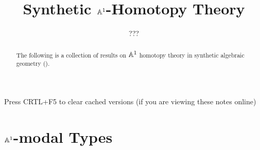 \documentclass{../util/zariski}
\title{Synthetic $\mathbb{A}^1$-Homotopy Theory}
\author{???}
\begin{document}
\maketitle

\begin{center}
  \color{purple}
  \large{Press CRTL+F5 to clear cached versions}
  \large{(if you are viewing these notes online)}
\end{center}

\begin{abstract}
  The following is a collection of results on $\mathbb{A}^1$ homotopy theory in synthetic algebraic geometry (\cite{draft}).
\end{abstract}

\tableofcontents

\section{$\mathbb{A}^1$-modal Types}


\printindex

\printbibliography
\end{document}

